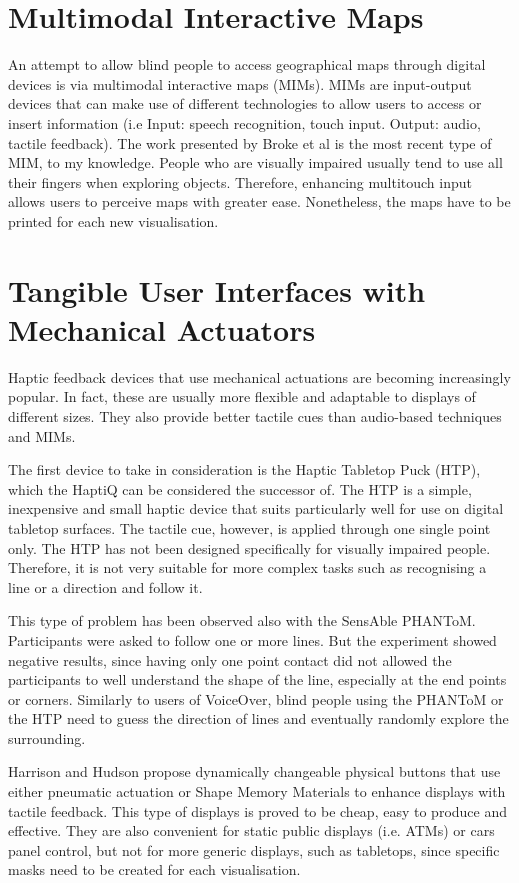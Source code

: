 \section{Multimodal Interactive Maps}
An attempt to allow blind people to access geographical maps through digital devices is via multimodal interactive maps (MIMs). MIMs are input-output devices that can make use of different technologies to allow users to access or insert information (i.e Input: speech recognition, touch input. Output: audio, tactile feedback). The work presented by Broke et al \cite{brock2010usage} is the most recent type of MIM, to my knowledge. People who are visually impaired usually tend to use all their fingers when exploring objects. Therefore, enhancing multitouch input allows users to perceive maps with greater ease. Nonetheless, the maps have to be printed for each new visualisation. 

\section{Tangible User Interfaces with Mechanical Actuators}
Haptic feedback devices that use mechanical actuations are becoming increasingly popular. In fact, these are usually more flexible and adaptable to displays of different sizes. They also provide better tactile cues than audio-based techniques and MIMs.

The first device to take in consideration is the Haptic Tabletop Puck (HTP)\cite{marquardt2009haptic}, which the HaptiQ can be considered the successor of. The HTP is a simple, inexpensive and small haptic device that suits particularly well for use on digital tabletop surfaces. The tactile cue, however, is applied through one single point only. The HTP has not been designed specifically for visually impaired people. Therefore, it is not very suitable for more complex tasks such as recognising a line or a direction and follow it. 

This type of problem has been observed also with the SensAble PHANToM\cite{massie1994phantom, yu2001haptic}. Participants were asked to follow one or more lines. But the experiment showed negative results, since having only one point contact did not allowed the participants to well understand the shape of the line, especially at the end points or corners. Similarly to users of VoiceOver, blind people using the PHANToM or the HTP need to guess the direction of lines and eventually randomly explore the surrounding. 

Harrison and Hudson \cite{harrison2009providing} propose dynamically changeable physical buttons that use either pneumatic actuation or Shape Memory Materials to enhance displays with tactile feedback. This type of displays is proved to be cheap, easy to produce and effective. They are also convenient for static public displays (i.e. ATMs) or cars panel control, but not for more generic displays, such as tabletops, since specific masks need to be created for each visualisation. 

